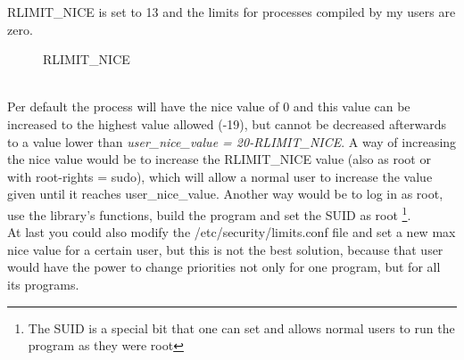 RLIMIT\_NICE is set to 13 and the limits for processes compiled by my users are zero.
\begin{figure}[!htb]
	\centering
	\caption{RLIMIT\_NICE} 
	\label{RLIMIT_NICE}
\end{figure}
\\
Per default the process will have
the nice value of 0 and this value can be increased to the highest value allowed (-19), but cannot be
decreased afterwards to a value lower than \textit{user\_nice\_value = 20-RLIMIT\_NICE}. A way of
increasing the nice value would be to increase the RLIMIT\_NICE value (also as root or with root-rights = sudo), which will allow a normal user to increase the value given until it reaches
\dq user\_nice\_value\dq{}. Another way would be to log in as root, use the library's functions, build the program and set the SUID as root
\footnote{The SUID is a special bit that one can set and allows normal users to run the program as they
were root}.\\
At last you could also modify the \dq/etc/security/limits.conf\dq{} file and set a new max nice value for a
certain user, but this is not the best solution, because that user would have the power to change
priorities not only for one program, but for all its programs.
